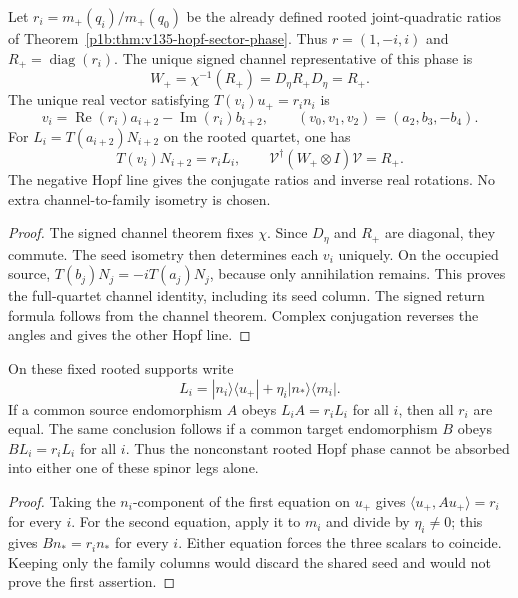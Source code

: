 \documentclass[11pt]{article}
\begin{document}
\begin{corollary}
\label{p1:cor:v242-joint-phase-vector-lift}
Let \(r_i=m_+(q_i)/m_+(q_0)\) be the already defined rooted joint-quadratic
ratios of Theorem~\ref{p1b:thm:v135-hopf-sector-phase}. Thus
\(r=(1,-i,i)\) and \(R_+=\operatorname{diag}(r_i)\).
The unique signed channel representative of this phase is
\[
 W_+=\chi^{-1}(R_+)=D_\eta R_+D_\eta=R_+.
\]
The unique real vector satisfying
\(T(v_i)u_+=r_i n_i\) is
\[
 v_i=\operatorname{Re}(r_i)a_{i+2}
       -\operatorname{Im}(r_i)b_{i+2},\qquad
 \boxed{(v_0,v_1,v_2)=(a_2,b_3,-b_4).}
\]
For \(L_i=T(a_{i+2})N_{i+2}\) on the rooted quartet, one has
\[
 T(v_i)N_{i+2}=r_iL_i,
 \qquad
 \boxed{\mathcal V^\dagger(W_+\otimes I)\mathcal V=R_+.}
\]
The negative Hopf line gives the conjugate ratios and inverse real
rotations. No extra channel-to-family isometry is chosen.
\end{corollary}
\begin{proof}
The signed channel theorem fixes \(\chi\). Since \(D_\eta\) and
\(R_+\) are diagonal, they commute. The seed isometry then determines
each \(v_i\) uniquely. On the occupied source,
\(T(b_j)N_j=-iT(a_j)N_j\), because only annihilation remains.
This proves the full-quartet channel identity, including its seed
column. The signed return formula follows from the channel theorem.
Complex conjugation reverses the angles and gives the other Hopf line.
\end{proof}

\begin{lemma}
\label{p1:lem:v242-one-leg-nonabsorption}
On these fixed rooted supports write
\[
 L_i=|n_i\rangle\langle u_+|
       +\eta_i|n_*\rangle\langle m_i|.
\]
If a common source endomorphism \(A\) obeys
\(L_iA=r_iL_i\) for all \(i\), then all \(r_i\) are equal.
The same conclusion follows if a common target endomorphism \(B\)
obeys \(BL_i=r_iL_i\) for all \(i\). Thus the nonconstant rooted
Hopf phase cannot be absorbed into either one of these spinor legs alone.
\end{lemma}
\begin{proof}
Taking the \(n_i\)-component of the first equation on \(u_+\) gives
\(\langle u_+,Au_+\rangle=r_i\) for every \(i\).
For the second equation, apply it to \(m_i\) and divide by
\(\eta_i\ne0\); this gives \(Bn_*=r_in_*\) for every \(i\).
Either equation forces the three scalars to coincide.
Keeping only the family columns would discard the shared seed and
would not prove the first assertion.
\end{proof}
\end{document}
